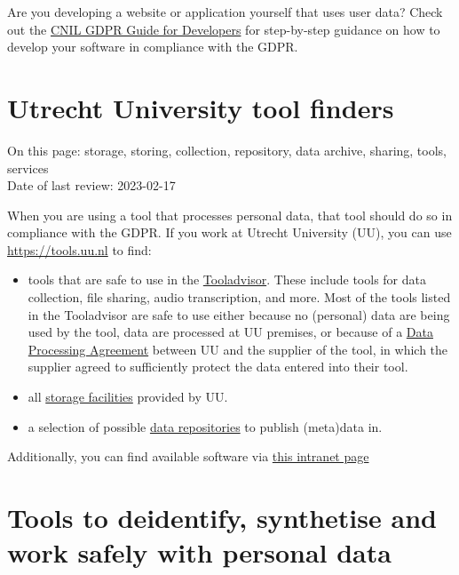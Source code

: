 \documentclass[
]{book}
\providecommand{\tightlist}{%
  \setlength{\itemsep}{0pt}\setlength{\parskip}{0pt}}
\begin{document}
Are you developing a website or application yourself that uses user data? Check
out the \href{https://lincnil.github.io/GDPR-Developer-Guide/}{CNIL GDPR Guide for Developers}
for step-by-step guidance on how to develop your software in compliance with the GDPR.

\hypertarget{uu-tools}{%
\section{Utrecht University tool finders}\label{uu-tools}}

On this page: storage, storing, collection, repository, data archive, sharing,
tools, services\\
Date of last review: 2023-02-17

When you are using a tool that processes personal data, that tool should do so
in compliance with the GDPR. If you work at Utrecht University (UU), you can use
\url{https://tools.uu.nl} to find:

\begin{itemize}
\tightlist
\item
  tools that are safe to use in the \href{https://tools.uu.nl/tooladvisor}{Tooladvisor}.
  These include tools for data collection, file sharing, audio transcription, and more.
  Most of the tools listed in the Tooladvisor are safe to use either because no (personal)
  data are being used by the tool, data are processed at UU premises, or because
  of a \protect\hyperlink{data-processing-agreement}{Data Processing Agreement} between
  UU and the supplier of the tool, in which the supplier agreed to
  sufficiently protect the data entered into their tool.
\item
  all \href{https://tools.uu.nl/storagefinder/}{storage facilities}
  provided by UU.
\item
  a selection of possible \href{https://tools.uu.nl/repository-decision-tool/}{data repositories}
  to publish (meta)data in.
\end{itemize}

Additionally, you can find available software via
\href{https://intranet.uu.nl/en/knowledgebase/software-at-work-teaching-rooms-and-home}{this intranet page}

\hypertarget{tool-repository}{%
\section{Tools to deidentify, synthetise and work safely with personal data}\label{tool-repository}}
\end{document}
